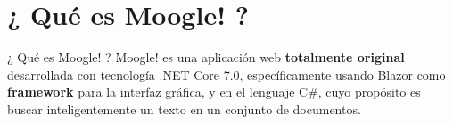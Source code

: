 \section{¿ Qué es Moogle! ?}


\begin{frame}{¿ Qué es Moogle! ?}
    Moogle! es una aplicación web \textbf{totalmente original} desarrollada con tecnología
	.NET Core 7.0, específicamente usando Blazor como \textbf{framework} para la interfaz
	gráfica, y en el lenguaje C\#, cuyo propósito es buscar inteligentemente un texto
	en un conjunto de documentos.
\end{frame}









    



